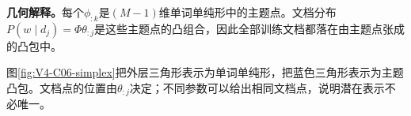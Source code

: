 \documentclass[UTF8,a4paper,11pt,openany]{ctexbook}
\begin{document}
\setcounter{page}{672}
\setcounter{chapter}{29}
\setcounter{figure}{1}
\pagestyle{headings}
\begin{geometrybox}
\textbf{几何解释。}每个$\phi_{:k}$是$(M-1)$维单词单纯形中的主题点。文档分布$P(w\mid d_j)=\Phi\theta_{:j}$是这些主题点的凸组合，因此全部训练文档都落在由主题点张成的凸包中。
\end{geometrybox}

图\ref{fig:V4-C06-simplex}把外层三角形表示为单词单纯形，把蓝色三角形表示为主题凸包。文档点的位置由$\theta_{:j}$决定；不同参数可以给出相同文档点，说明潜在表示不必唯一。
\end{document}
